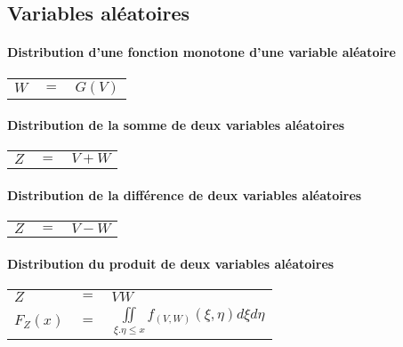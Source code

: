 \subsection{Variables aléatoires}

\paragraph{Distribution d'une fonction monotone d'une variable aléatoire}
\begin{center}
\begin{tabular}{lll}

    $W$        & $=$ & $G(V)$ \\
    
\end{tabular}
\end{center}
\paragraph{Distribution de la somme de deux variables aléatoires}
\begin{center}
\begin{tabular}{lll}

    $Z$        & $=$ & $V+W$ \\
    
\end{tabular}
\end{center}
\paragraph{Distribution de la différence de deux variables aléatoires}
\begin{center}
\begin{tabular}{lll}

    $Z$        & $=$ & $V-W$ \\
    
\end{tabular}
\end{center}
\paragraph{Distribution du produit de deux variables aléatoires}
\begin{center}
\begin{tabular}{lll}

    $Z$        & $=$ & $VW$ \\
    $F_Z(x)$ & $=$ & $\iint\limits_{\xi.\eta\leq x} f_{(V,W)}(\xi,\eta)d\xi d\eta$\\
    
\end{tabular}
\end{center}
